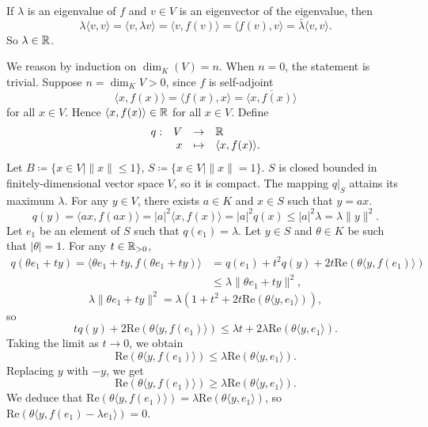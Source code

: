 \begin{proofenv}
    If $\lambda$ is an eigenvalue of $f$ and $v\in V$ is an eigenvector of the eigenvalue, then
    $$ \lambda \langle v,v\rangle = \langle v,\lambda v\rangle = \langle v,f(v)\rangle = \langle f(v), v\rangle = \bar{\lambda} \langle v,v\rangle.$$
    So $\lambda \in \mathbb{R}$.

    \quad We reason by induction on $\dim_{K} (V) = n$.
    When $n = 0$, the statement is trivial.
    Suppose $n = \dim_{K} V >0$, since $f$ is self-adjoint
    $$ \langle x,f(x)\rangle = \langle f(x),x \rangle = \overline{\langle x, f(x)\rangle}$$
    for all $x \in V$.
    Hence $\langle x,f(x)\rangle \in \mathbb{R}$ for all $x \in V$.
    Define 
    $$ \begin{array}{rrcl}
        q: & V & \rightarrow & \mathbb{R}\\
        & x & \mapsto & \langle x,f(x)\rangle.
    \end{array}
    $$
    Let $B\coloneq \{x \in V \mid \|x\| \le 1\}$, $S\coloneq \{x \in V\mid \|x\| = 1\}$.
    $S$ is closed bounded in finitely-dimensional vector space $V$, so it is compact.
    The mapping $q|_S$ attains its maximum $\lambda$.
    For any $y \in V$, there exists $a\in K$ and $x \in S$ such that $y = a x$.
    $$ q(y) = \langle ax, f(ax)\rangle = |a|^2 \langle x,f(x)\rangle = |a|^2 q(x) \le |a|^2 \lambda = \lambda\|y\|^2.$$
    Let $e_1$ be an element of $S$ such that $q(e_1) = \lambda$.
    Let $y\in S$ and $\theta \in K$ be such that $|\theta|=1$.
    For any $t \in \mathbb{R}_{>0}$,
    $$\begin{aligned}
        q(\theta e_1 + ty) = \langle \theta e_1 + ty, f(\theta e_1 + ty)\rangle &= q(e_1) + t^2 q(y) + 2t\mathrm{Re}\left(\theta\langle y,f(e_1)\rangle\right)\\
        &\le \lambda\|\theta e_1 + ty\|^2,
    \end{aligned}$$
    $$ \lambda \|\theta e_1 + ty\|^2 = \lambda\left(1+ t^2 +2t \mathrm{Re}(\theta\langle y,e_1\rangle)\right),$$
    so
    $$ tq(y) + 2\mathrm{Re} \left(\theta \langle y,f(e_1)\rangle\right)\le \lambda t + 2\lambda \mathrm{Re} \left(\theta\langle y,e_1\rangle\right).$$
    Taking the limit as $t\rightarrow 0$, we obtain
    $$ \mathrm{Re} \left(\theta \langle y,f(e_1)\rangle\right) \le \lambda \mathrm{Re} \left(\theta \langle y,e_1\rangle\right).$$
    Replacing $y$ with $-y$, we get
    $$ \mathrm{Re} \left(\theta \langle y,f(e_1)\rangle\right)\ge \lambda \mathrm{Re} \left(\theta \langle y,e_1\rangle\right).$$
    We deduce that $\mathrm{Re}\left(\theta\langle y,f(e_1)\rangle\right) = \lambda \mathrm{Re}\left(\theta \langle y, e_1\rangle\right)$, so $\mathrm{Re}\left(\theta\langle y, f(e_1)-\lambda e_1\rangle\right) = 0.$

\end{proofenv}
